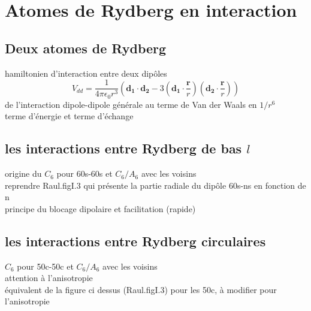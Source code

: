 \section{Atomes de Rydberg en interaction}
	\subsection{Deux atomes de Rydberg}
		\noindent hamiltonien d'interaction entre deux dipôles
		\[
		V_{dd} = \frac{1}{4\pi\epsilon_0 r^3} \left( \mathbf{d_1}\cdot \mathbf{d_2} - 3(\mathbf{d_1}\cdot \frac{\mathbf{r}}{r})(\mathbf{d_2}\cdot\frac{\mathbf{r}}{r}) \right)
		\]
		\noindent de l'interaction dipole-dipole générale au terme de Van der Waals en $1/r^6$ \\
		\noindent terme d'énergie et terme d'échange
	\subsection{les interactions entre Rydberg de bas $l$}
		\noindent origine du $C_6$ pour 60s-60s et $C_6/A_6$ avec les voisins\\
		reprendre Raul.figI.3 qui présente la partie radiale du dipôle 60s-ns en fonction de n\\
		\noindent principe du blocage dipolaire et facilitation (rapide)
	\subsection{les interactions entre Rydberg circulaires}
		\noindent $C_6$ pour 50c-50c et $C_6/A_6$ avec les voisins \\
		\noindent attention à l'anisotropie\\
		équivalent de la figure ci dessus (Raul.figI.3) pour les 50c, à modifier pour l'anisotropie
